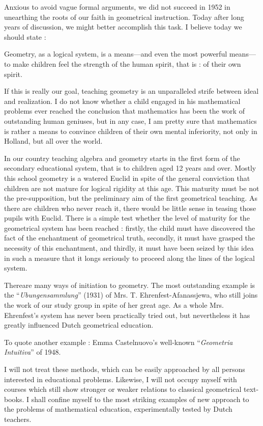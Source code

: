 \smallskip
Anxious to avoid vague formal arguments, we did not succeed in 1952 in unearthing the roots of our faith in geometrical instruction. Today after long years of discussion, we might better accomplish this task. I believe today we should state :

\smallskip
Geometry, as a logical system, is a means---and even the most powerful means---to make children feel the strength of the human spirit, that is : of their own spirit.

\smallskip
If this is really our goal, teaching geometry is an unparalleled strife between ideal and realization. I do not know whether a child engaged in his mathematical problems ever reached the conclusion that mathematics has been the work of outstanding human geniuses, but in any case, I am pretty sure that mathematics is rather a means to convince children of their own mental inferiority, not only in Holland, but all over the world.

\smallskip
In our country teaching algebra and geometry starts in the first form of the secondary educational system, that is to children aged 12 years and over. Mostly this school geometry is a watered Euclid in spite of the general conviction that children are not mature for logical rigidity at this age. This maturity must be not the pre-supposition, but the preliminary aim of the first geometrical teaching. As there are children who never reach it, there would be little sense in teasing those pupils with Euclid. There is a simple test whether the level of maturity for the geometrical system has been reached : firstly, the child must have discovered the fact of the enchantment of geometrical truth, secondly, it must have grasped the necessity of this enchantment, and thirdly, it must have been seized by this idea in such a measure that it longs seriously to proceed along the lines of the logical system.

There\pageoriginale are many ways of initiation to geometry. The most outstanding example is the ``{\em Ubungensammlung}'' (1931) of Mrs. T. Ehrenfest-Afanassjewa, who still joins the work of our study group in spite of her great age. As a whole Mrs. Ehrenfest's system has never been practically tried out, but nevertheless it has greatly influenced Dutch geometrical education.

To quote another example : Emma Castelnuovo's well-known ``{\em Geometria Intuitiva}'' of 1948.

I will not treat these methods, which can be easily approached by all persons interested in educational problems. Likewise, I will not occupy myself with courses which still show stronger or weaker relations to classical geometrical text-books. I shall confine myself to the most striking examples of new approach to the problems of mathematical education, experimentally tested by Dutch teachers.

